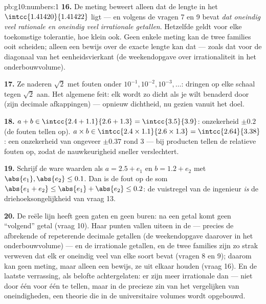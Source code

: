 \begin{solution}{pb:g10:numbers:1}
\textbf{16.} De meting beweert alleen dat de lengte in het 
$\intcc{1.41420}{1.41422}$ ligt --- en volgens de vragen 7 en 9 bevat
\emph{dat  oneindig veel rationale en oneindig veel irrationale
getallen}. Hetzelfde geldt voor elke toekomstige tolerantie, hoe klein ook.
Geen enkele meting kan de twee families ooit scheiden; alleen een bewijs
over de exacte lengte kan dat --- zoals dat voor de diagonaal van het
eenheidsvierkant (de weekendopgave over irrationaliteit in het
onderbouwvolume).

\textbf{17.} Ze naderen $\sqrt2$ met fouten onder $10^{-1}, 10^{-2},
10^{-3}, \dots$:  dringen op elke schaal tegen $\sqrt2$
aan. Het algemene feit: elk  wordt zo dicht als je wilt benaderd
door  (zijn decimale afkappingen) --- opnieuw dichtheid,
nu gezien vanuit het doel.

\textbf{18.} $a + b \in \intcc{2.4 + 1.1}{2.6 + 1.3} = \intcc{3.5}{3.9}$:
onzekerheid $\pm 0.2$ (de fouten tellen op).
$a \times b \in \intcc{2.4 \times 1.1}{2.6 \times 1.3} =
\intcc{2.64}{3.38}$: een onzekerheid van ongeveer $\pm 0.37$ rond $3$ ---
bij producten tellen de relatieve fouten op, zodat de nauwkeurigheid
sneller verslechtert.

\textbf{19.} Schrijf de ware waarden als $a = 2.5 + e_1$ en
$b = 1.2 + e_2$ met $\abs{e_1}, \abs{e_2} \leq 0.1$. Dan is de fout op de
som $\abs{e_1 + e_2} \leq \abs{e_1} + \abs{e_2} \leq 0.2$: de vuistregel
van de ingenieur \emph{is} de driehoeksongelijkheid van vraag 13.

\textbf{20.} De reële lijn heeft geen gaten en geen buren: na een getal
komt geen ``volgend'' getal (vraag 10). Haar punten vallen uiteen in de
 --- precies de afbrekende of repeterende decimale
getallen (de weekendopgave daarover in het onderbouwvolume) --- en de
irrationale getallen, en de twee families zijn zo strak verweven dat elk
 er oneindig veel van elke soort bevat (vragen 8 en 9); daarom kan
geen meting, maar alleen een bewijs, ze uit elkaar houden (vraag 16). En de
laatste verrassing, als belofte achtergelaten: er zijn meer irrationale dan
 --- niet door één voor één te tellen, maar in de
precieze zin van het vergelijken van oneindigheden, een theorie die in de
universitaire volumes wordt opgebouwd.
\end{solution}
